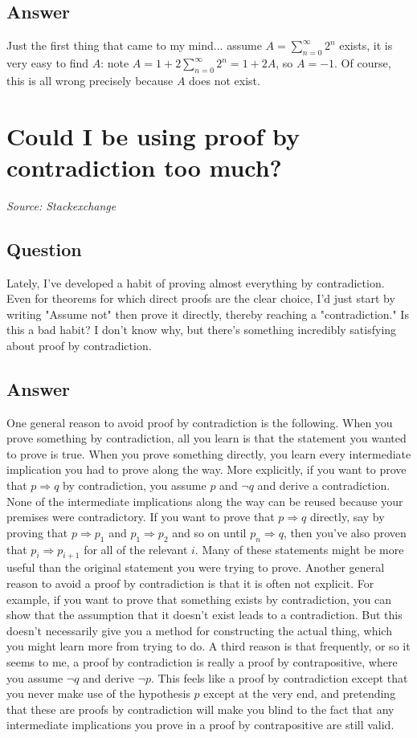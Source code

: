 \documentclass{article}
\begin{document}
\subsection*{Answer}
Just the first thing that came to my mind... assume $A=\sum_{n=0}^{\infty}2^n $ exists, it is very easy to find $A $: note $A=1+2\sum_{n=0}^{\infty}2^n =1+2A $, so $A=-1$. Of course, this is all wrong precisely because $A $ does not exist.

\newpage

\section{Could I be using proof by contradiction too much?}
\textit{Source: Stackexchange}

\subsection*{Question}
Lately, I've developed a habit of proving almost everything by contradiction. Even for theorems for which direct proofs are the clear choice, I'd just start by writing "Assume not" then prove it directly, thereby reaching a "contradiction." Is this a bad habit? I don't know why, but there's something incredibly satisfying about proof by contradiction.

\subsection*{Answer}
One general reason to avoid proof by contradiction is the following. When you prove something by contradiction, all you learn is that the statement you wanted to prove is true. When you prove something directly, you learn every intermediate implication you had to prove along the way. More explicitly, if you want to prove that $p \Rightarrow q$ by contradiction, you assume $p$ and $\neg q$ and derive a contradiction. None of the intermediate implications along the way can be reused because your premises were contradictory. If you want to prove that $p \Rightarrow q$ directly, say by proving that $p \Rightarrow p_1$ and $p_1 \Rightarrow p_2$ and so on until $p_n \Rightarrow q$, then you've also proven that $p_i \Rightarrow p_{i+1}$ for all of the relevant $i$. Many of these statements might be more useful than the original statement you were trying to prove. Another general reason to avoid a proof by contradiction is that it is often not explicit. For example, if you want to prove that something exists by contradiction, you can show that the assumption that it doesn't exist leads to a contradiction. But this doesn't necessarily give you a method for constructing the actual thing, which you might learn more from trying to do. A third reason is that frequently, or so it seems to me, a proof by contradiction is really a proof by contrapositive, where you assume $\neg q$ and derive $\neg p$. This feels like a proof by contradiction except that you never make use of the hypothesis $p$ except at the very end, and pretending that these are proofs by contradiction will make you blind to the fact that any intermediate implications you prove in a proof by contrapositive are still valid.
\end{document}
